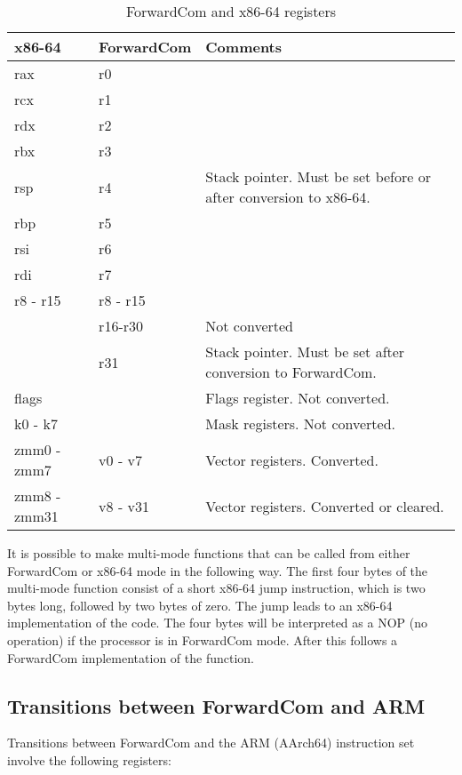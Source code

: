 \documentclass[forwardcom.tex]{subfiles}
\begin{document}
\begin{longtable} {|p{20mm}|p{20mm}|p{80mm}|}
\caption{ForwardCom and x86-64 registers} 
\label{table:ForwardComAndX64Registers}
\\
\endfirsthead
\endhead
\hline
\bfseries x86-64 & \bfseries ForwardCom & \bfseries Comments  \\
\hline
rax & r0 &   \\ 
rcx & r1 &  \\ 
rdx & r2 &  \\ 
rbx & r3 &  \\ 
rsp & r4 & Stack pointer. Must be set before or after conversion to x86-64. \\
rbp & r5 &  \\ 
rsi & r6 &  \\ 
rdi & r7 &  \\ 
r8 - r15 & r8 - r15 &  \\
\hline
 & r16-r30  & Not converted \\
 & r31 & Stack pointer. Must be set after conversion to ForwardCom. \\
\hline
flags &  & Flags register. Not converted. \\
\hline
k0 - k7 &  & Mask registers. Not converted. \\
\hline
zmm0 - zmm7 & v0 - v7 & Vector registers. Converted. \\
zmm8 - zmm31 & v8 - v31 & Vector registers. Converted or cleared. \\
\hline
\end{longtable}

\vv
It is possible to make multi-mode functions that can be called from either ForwardCom or x86-64 mode in the following way. The first four bytes of the multi-mode function consist of a short x86-64 jump instruction, which is two bytes long, followed by two bytes of zero. The jump leads to an x86-64 implementation of the code. The four bytes will be interpreted as a NOP (no operation) if the processor is in ForwardCom mode. After this follows a ForwardCom implementation of the function.


\subsection{Transitions between ForwardCom and ARM}

Transitions between ForwardCom and the ARM (AArch64) instruction set involve the following registers:
\end{document}

